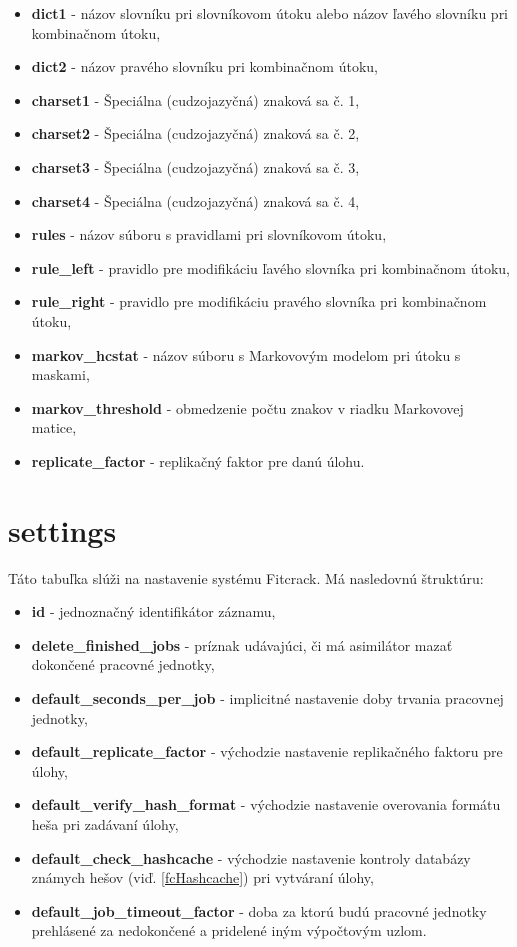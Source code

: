 \documentclass[zadani,slovak]{fitthesis}
\begin{document}
\begin{itemize}
    \item \textbf{dict1} - názov slovníku pri slovníkovom útoku alebo názov ľavého slovníku pri kombinačnom útoku,
    \item \textbf{dict2} - názov pravého slovníku pri kombinačnom útoku,
    \item \textbf{charset1} - Špeciálna (cudzojazyčná) znaková sa č. 1,
    \item \textbf{charset2} - Špeciálna (cudzojazyčná) znaková sa č. 2,
    \item \textbf{charset3} - Špeciálna (cudzojazyčná) znaková sa č. 3,
    \item \textbf{charset4} - Špeciálna (cudzojazyčná) znaková sa č. 4,
    \item \textbf{rules} - názov súboru s pravidlami pri slovníkovom útoku,
    \item \textbf{rule\_left} - pravidlo pre modifikáciu ľavého slovníka pri kombinačnom útoku,
    \item \textbf{rule\_right} - pravidlo pre modifikáciu pravého slovníka pri kombinačnom útoku,
    \item \textbf{markov\_hcstat} - názov súboru s Markovovým modelom pri útoku s maskami,
    \item \textbf{markov\_threshold} - obmedzenie počtu znakov v riadku Markovovej matice,
    \item \textbf{replicate\_factor} - replikačný faktor pre danú úlohu.
\end{itemize}


\section{settings}
Táto tabuľka slúži na nastavenie systému Fitcrack. Má nasledovnú štruktúru:
\begin{itemize}
\item \textbf{id} - jednoznačný identifikátor záznamu,
\item \textbf{delete\_finished\_jobs} - príznak udávajúci, či má asimilátor mazať dokončené pracovné jednotky,
\item \textbf{default\_seconds\_per\_job} - implicitné nastavenie doby trvania pracovnej jednotky,
\item \textbf{default\_replicate\_factor} - východzie nastavenie replikačného faktoru pre úlohy,
\item \textbf{default\_verify\_hash\_format} - východzie nastavenie overovania formátu heša pri zadávaní úlohy,
\item \textbf{default\_check\_hashcache} - východzie nastavenie kontroly databázy známych hešov (viď. \ref{fcHashcache}) pri vytváraní úlohy,
\item \textbf{default\_job\_timeout\_factor} - doba za ktorú budú pracovné jednotky prehlásené za nedokončené a pridelené iným výpočtovým uzlom.
\end{itemize}
\end{document}

